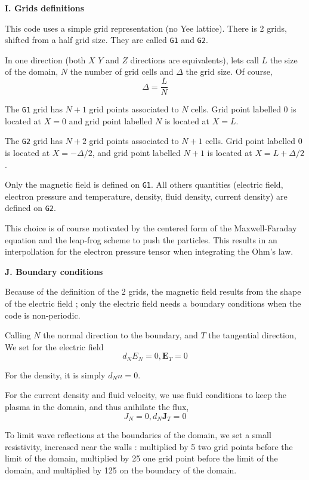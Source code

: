 \documentclass[a4paper,11pt]{letter}
\begin{document}
\newpage

{\bf I. Grids definitions}

This code uses a simple grid representation (no Yee lattice). There is 2 grids, shifted from a half grid size. They are called {\tt G1} and {\tt G2}.

In one direction (both $X$ $Y$ and $Z$ directions are equivalents), lets call $L$ the size of the domain, $N$ the number of grid cells and $\Delta$ the grid size. Of course,
$$
\Delta = \frac{L}{N}
$$

The {\tt G1} grid has $N+1$ grid points associated to $N$ cells. Grid point labelled 0 is located at $X=0$ and grid point labelled $N$ is located at $X=L$.

The {\tt G2} grid has $N+2$ grid points associated to $N+1$ cells. Grid point labelled 0 is located at $X=-\Delta/2$, and grid point labelled $N+1$ is located at $X=L+\Delta/2$.

Only the magnetic field is defined on {\tt G1}. All others quantities (electric field, electron pressure and temperature, density, fluid density, current density) are defined on {\tt G2}.

This choice is of course motivated by the centered form of the Maxwell-Faraday equation and the leap-frog scheme to push the particles. This results in an interpollation for the electron pressure tensor when integrating the Ohm's law.

\newpage

{\bf J. Boundary conditions}

Because of the definition of the 2 grids, the magnetic field results from the shape of the electric field ; only the electric field needs a boundary conditions when the code is non-periodic.

Calling $N$ the normal direction to the boundary, and $T$ the tangential direction, We set for the electric field
$$
d_N E_N = 0, \mathbf E_T = 0
$$

For the density, it is simply $d_N n = 0$.

For the current density and fluid velocity, we use fluid conditions to keep the plasma in the domain, and thus anihilate the flux,
$$
J_N = 0, d_N \mathbf J_T = 0
$$

To limit wave reflections at the boundaries of the domain, we set a small resistivity, increased near the walls : multiplied by 5 two grid points before the limit of the domain, multiplied by 25 one grid point before the limit of the domain, and multiplied by 125 on the boundary of the domain.
\end{document}
